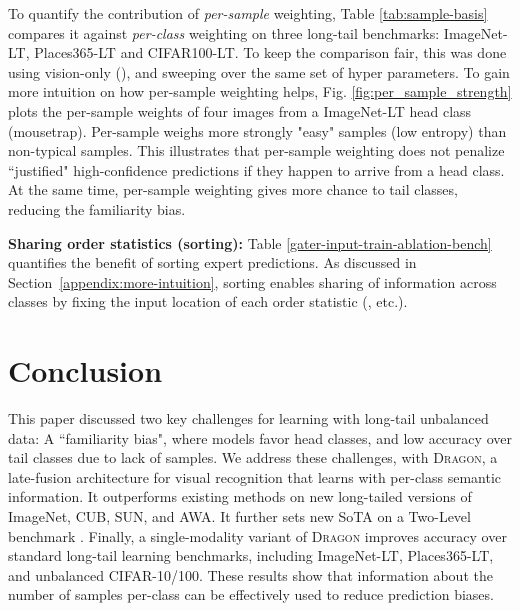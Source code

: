 \documentclass[10pt,twocolumn,letterpaper]{article}
\newcommand{\secref}[1]{Section~\ref{#1}}
\newcommand{\DRAGON}{\textsc{Dragon}}
\newcommand{\TwoLevel}{Two-Level}
\begin{document}
\begin{table}
\centering
\caption{Ablation study, quantifying the contribution of sorting the fusion-module inputs (validation set, CUB-LT).} 
\label{gater-input-train-ablation-bench}
\end{table}

To quantify the contribution of \textit{per-sample} weighting, Table \ref{tab:sample-basis} compares it against \textit{per-class} weighting on three long-tail benchmarks: ImageNet-LT, Places365-LT and CIFAR100-LT. To keep the comparison fair, this was done using vision-only (), and sweeping over the same set of hyper parameters. 
To gain more intuition on how per-sample weighting helps, Fig. \ref{fig:per_sample_strength} plots the per-sample weights of four images from a ImageNet-LT head class (mousetrap). Per-sample weighs more strongly "easy" samples (low entropy) than non-typical samples. This illustrates that per-sample weighting does not penalize ``justified" high-confidence predictions if they happen to arrive from a head class. At the same time, per-sample weighting gives more chance to tail classes, reducing the familiarity bias.

\textbf{Sharing order statistics (sorting):}
Table \ref{gater-input-train-ablation-bench} quantifies the benefit of sorting expert predictions. As discussed in \secref{appendix:more-intuition}, sorting enables sharing of information across classes by fixing the input location of each order statistic (,  etc.).


\section{Conclusion}
This paper discussed two key challenges for learning with long-tail unbalanced data: A ``familiarity bias", where models favor head classes, and low accuracy over tail classes due to lack of samples. We address these challenges, with \DRAGON{}, a late-fusion architecture for visual recognition that learns with per-class semantic information. It outperforms existing methods on new long-tailed versions of ImageNet, CUB, SUN, and AWA. It further sets new SoTA on a \TwoLevel{} benchmark \cite{Schnfeld2019GeneralizedZL}. Finally, a single-modality variant of \DRAGON{} improves accuracy over standard long-tail learning benchmarks, including ImageNet-LT, Places365-LT, and unbalanced CIFAR-10/100. These results show that information about the number of samples per-class can be effectively used to reduce prediction biases. 
\end{document}

